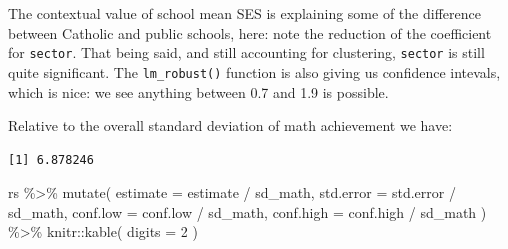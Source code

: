 \documentclass[
  letterpaper,
  DIV=11,
  numbers=noendperiod]{scrreprt}
\newenvironment{Shaded}{}{}
\newcommand{\AttributeTok}[1]{\textcolor[rgb]{0.49,0.56,0.16}{#1}}
\newcommand{\DecValTok}[1]{\textcolor[rgb]{0.25,0.63,0.44}{#1}}
\newcommand{\FunctionTok}[1]{\textcolor[rgb]{0.02,0.16,0.49}{#1}}
\newcommand{\NormalTok}[1]{#1}
\newcommand{\OtherTok}[1]{\textcolor[rgb]{0.00,0.44,0.13}{#1}}
\newcommand{\SpecialCharTok}[1]{\textcolor[rgb]{0.25,0.44,0.63}{#1}}
\begin{document}
The contextual value of school mean SES is explaining some of the
difference between Catholic and public schools, here: note the reduction
of the coefficient for \texttt{sector}. That being said, and still
accounting for clustering, \texttt{sector} is still quite significant.
The \texttt{lm\_robust()} function is also giving us confidence
intevals, which is nice: we see anything between 0.7 and 1.9 is
possible.

Relative to the overall standard deviation of math achievement we have:

\begin{Shaded}
\end{Shaded}

\begin{verbatim}
[1] 6.878246
\end{verbatim}

\begin{Shaded}
\begin{Highlighting}[]
\NormalTok{rs }\SpecialCharTok{\%\textgreater{}\%}
  \FunctionTok{mutate}\NormalTok{( }\AttributeTok{estimate =}\NormalTok{ estimate }\SpecialCharTok{/}\NormalTok{ sd\_math,}
          \AttributeTok{std.error =}\NormalTok{ std.error }\SpecialCharTok{/}\NormalTok{ sd\_math,}
          \AttributeTok{conf.low =}\NormalTok{ conf.low }\SpecialCharTok{/}\NormalTok{ sd\_math,}
          \AttributeTok{conf.high =}\NormalTok{ conf.high }\SpecialCharTok{/}\NormalTok{ sd\_math ) }\SpecialCharTok{\%\textgreater{}\%}
\NormalTok{  knitr}\SpecialCharTok{::}\FunctionTok{kable}\NormalTok{( }\AttributeTok{digits =} \DecValTok{2}\NormalTok{ )}
\end{Highlighting}
\end{Shaded}
\end{document}
